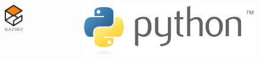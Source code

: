 \begin{frame}
\begin{columns}
\begin{column}{0.25\textwidth}
\begin{figure}
\begin{center}
					\includegraphics[width=\textwidth]{img/Gazebo_logo.png}		
				\end{center}
			\end{figure}
		\end{column}
				\begin{column}{0.25\textwidth}
			\begin{figure}
				\begin{center}
					\includegraphics[width=\textwidth]{img/Python_logo.png}			

\end{center}
\end{figure}
\end{column}
\end{columns}
\end{frame}
